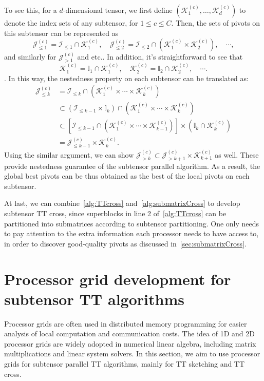 \documentclass[11pt,a4paper,review]{siamart220329}
\begin{document}
To see this, for a $d$-dimensional tensor, we first define $(\mathcal{K}_1^{(c)},\dots,\mathcal{K}_d^{(c)})$ to denote the index sets of any subtensor, for $1 \le c \le C$. Then, the sets of pivots on this subtensor can be represented as
\[ \mathcal{J}_{\le 1}^{(c)} = \mathcal{I}_{\le 1} \cap \mathcal{K}_1^{(c)}, \quad \mathcal{J}_{\le 2}^{(c)} = \mathcal{I}_{\le 2} \cap (\mathcal{K}_1^{(c)} \times \mathcal{K}_2^{(c)}), \quad\cdots, \] 
and similarly for $\mathcal{J}_{> 1}^{(c)}$ and etc.. In addition, it's straightforward to see that 
\[ \mathcal{K}_1^{(c)} = \mathbb{I}_1 \cap \mathcal{K}_1^{(c)}, \quad \mathcal{K}_2^{(c)} = \mathbb{I}_2 \cap \mathcal{K}_2^{(c)},\quad \cdots. \].
In this way, the nestedness property on each subtensor can be translated as:
\begin{align*}
\mathcal{J}_{\le k}^{(c)} &= \mathcal{I}_{\le k} \cap \left(\mathcal{K}_1^{(c)} \times\cdots\times \mathcal{K}_k^{(c)}\right) \\
&\subset (\mathcal{I}_{\le k-1} \times \mathbb{I}_k) \cap \left(\mathcal{K}_1^{(c)} \times\cdots\times \mathcal{K}_k^{(c)}\right) \\
&\subset \left[\mathcal{I}_{\le k-1} \cap \left(\mathcal{K}_1^{(c)} \times\cdots\times \mathcal{K}_{k-1}^{(c)}\right)\right] \times \left( \mathbb{I}_k \cap \mathcal{K}_k^{(c)}\right) \\
&= \mathcal{J}_{\le k-1}^{(c)} \times \mathcal{K}_k^{(c)}.
\end{align*}
Using the similar argument, we can show $\mathcal{J}_{>k}^{(c)} \subset \mathcal{J}_{>k+1}^{(c)} \times \mathcal{K}_{k+1}^{(c)}$ as well. These provide nestedness guarantee of the subtensor parallel algorithm. As a result, the global best pivots can be thus obtained as the best of the local pivots on each subtensor.

At last, we can combine~\cref{alg:TTcross} and~\cref{alg:submatrixCross} to develop subtensor TT cross, since superblocks in line 2 of~\cref{alg:TTcross} can be partitioned into submatrices according to subtensor partitioning. One only needs to pay attention to the extra information each processor needs to have access to, in order to discover good-quality pivots as discussed in~\cref{sec:submatrixCross}.

\section{Processor grid development for subtensor TT algorithms}
\label{sec:subComm}
Processor grids are often used in distributed memory programming for easier analysis of local computation and communication costs. The idea of 1D and 2D processor grids are widely adopted in numerical linear algebra, including matrix multiplications and linear system solvers. In this section, we aim to use processor grids for subtensor parallel TT algorithms, mainly for TT sketching and TT cross.
\end{document}

